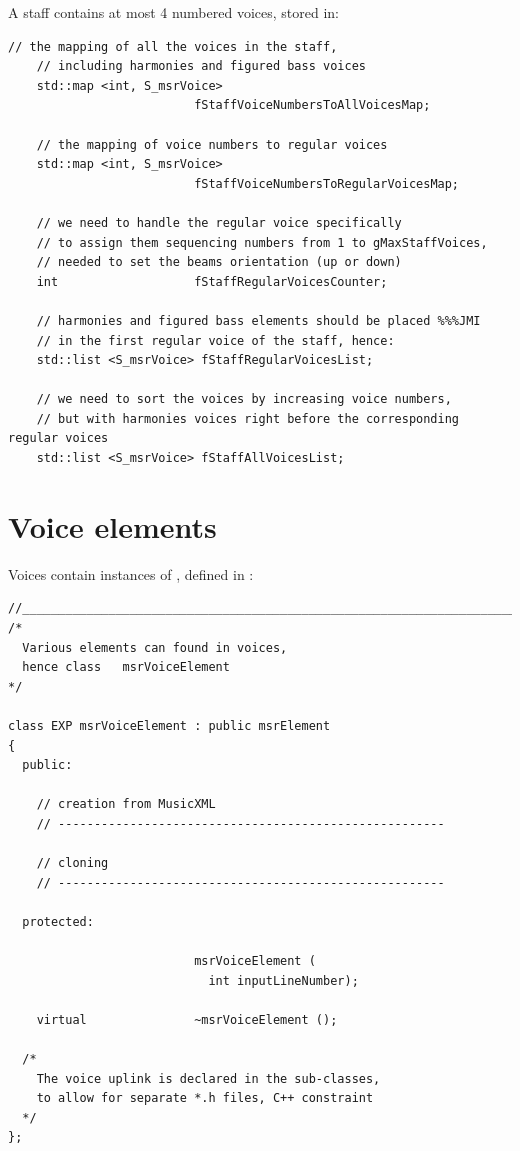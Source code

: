 A staff contains at most 4 numbered voices, stored in:
\begin{lstlisting}[language=CPlusPlus]
    // the mapping of all the voices in the staff,
    // including harmonies and figured bass voices
    std::map <int, S_msrVoice>
                          fStaffVoiceNumbersToAllVoicesMap;

    // the mapping of voice numbers to regular voices
    std::map <int, S_msrVoice>
                          fStaffVoiceNumbersToRegularVoicesMap;

    // we need to handle the regular voice specifically
    // to assign them sequencing numbers from 1 to gMaxStaffVoices,
    // needed to set the beams orientation (up or down)
    int                   fStaffRegularVoicesCounter;

    // harmonies and figured bass elements should be placed %%%JMI
    // in the first regular voice of the staff, hence:
    std::list <S_msrVoice> fStaffRegularVoicesList;

    // we need to sort the voices by increasing voice numbers,
    // but with harmonies voices right before the corresponding regular voices
    std::list <S_msrVoice> fStaffAllVoicesList;
\end{lstlisting}


\section{Voice elements}\label{Voice elements}

Voices contain instances of , defined in :
\begin{lstlisting}[language=CPlusPlus]
//______________________________________________________________________________
/*
  Various elements can found in voices,
  hence class   msrVoiceElement
*/

class EXP msrVoiceElement : public msrElement
{
  public:

    // creation from MusicXML
    // ------------------------------------------------------

    // cloning
    // ------------------------------------------------------

  protected:

                          msrVoiceElement (
                            int inputLineNumber);

    virtual               ~msrVoiceElement ();

  /*
    The voice uplink is declared in the sub-classes,
    to allow for separate *.h files, C++ constraint
  */
};
\end{lstlisting}


